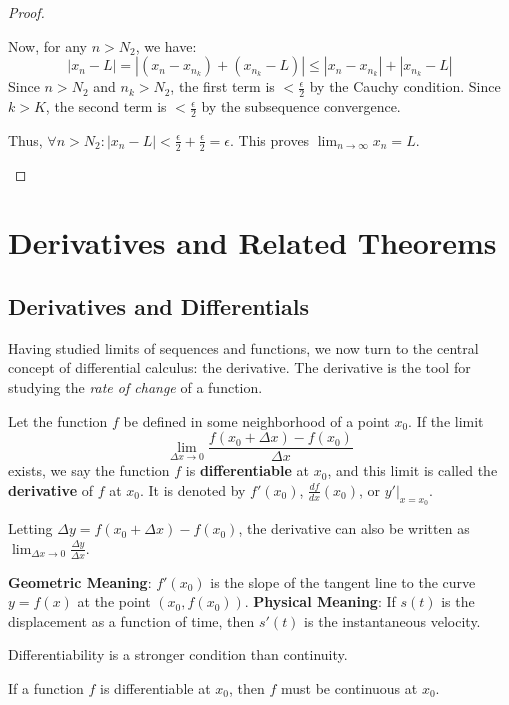 \begin{proof}
\begin{enumerate}
    Now, for any $n > N_2$, we have:
    \[
    |x_n - L| = |(x_n - x_{n_k}) + (x_{n_k} - L)| \leq |x_n - x_{n_k}| + |x_{n_k} - L|
    \]
    Since $n > N_2$ and $n_k > N_2$, the first term is $< \frac{\epsilon}{2}$ by the Cauchy condition.
    Since $k > K$, the second term is $< \frac{\epsilon}{2}$ by the subsequence convergence.
    
    Thus, $\forall n > N_2: |x_n - L| < \frac{\epsilon}{2} + \frac{\epsilon}{2} = \epsilon$.
    This proves $\lim_{n \to \infty} x_n = L$.
\end{enumerate}
\end{proof}

\section{Derivatives and Related Theorems}

\subsection{Derivatives and Differentials}

Having studied limits of sequences and functions, we now turn to the central concept of differential calculus: the derivative. The derivative is the tool for studying the \textit{rate of change} of a function.

\begin{definition}[Derivative]
Let the function $f$ be defined in some neighborhood of a point $x_0$. If the limit
\[
\lim_{\Delta x \to 0} \frac{f(x_0 + \Delta x) - f(x_0)}{\Delta x}
\]
exists, we say the function $f$ is \textbf{differentiable} at $x_0$, and this limit is called the \textbf{derivative} of $f$ at $x_0$.
It is denoted by $f'(x_0)$, $\frac{df}{dx}(x_0)$, or $y'|_{x=x_0}$.

Letting $\Delta y = f(x_0 + \Delta x) - f(x_0)$, the derivative can also be written as $\lim_{\Delta x \to 0} \frac{\Delta y}{\Delta x}$.
\end{definition}



\textbf{Geometric Meaning}: $f'(x_0)$ is the slope of the tangent line to the curve $y=f(x)$ at the point $(x_0, f(x_0))$.
\textbf{Physical Meaning}: If $s(t)$ is the displacement as a function of time, then $s'(t)$ is the instantaneous velocity.

Differentiability is a stronger condition than continuity.

\begin{theorem}
If a function $f$ is differentiable at $x_0$, then $f$ must be continuous at $x_0$.
\end{theorem}

